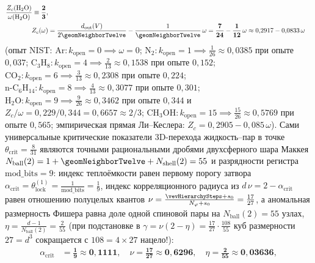 \begin{theorem}[Классификация четырёх элементарных механизмов химических реакций по каналам $(V,E,\triangle,\square)$ и закон $8 = 3 + 2 + 3$ ферментативного катализа]
\begin{enumerate}[leftmargin=*]
\begin{enumerate}[label=(\roman*),leftmargin=*,noitemsep]
\begin{equation}
\begin{aligned}
      \frac{Z_c(\mathrm{H_2O})}{\omega(\mathrm{H_2O})} \equiv \mathbf{\frac{2}{3}},\\
      Z_c(\omega) &= \frac{d_{\mathrm{out}}(V)}{2\geomNeighborTwelve} - \frac{1}{\geomNeighborTwelve}\,\omega
      = \mathbf{\frac{7}{24} - \frac{1}{12}\,\omega} \approx 0{,}2917 - 0{,}0833\,\omega
    \end{aligned}
    \end{equation}
    (опыт NIST: $\mathrm{Ar}\colon k_{\mathrm{open}}=0 \implies \omega=0$; $\mathrm{N_2}\colon k_{\mathrm{open}}=1 \implies \frac{1}{26}\approx 0{,}0385$ при опыте $0{,}037$; $\mathrm{C_3H_8}\colon k_{\mathrm{open}}=4 \implies \frac{2}{13}\approx 0{,}1538$ при опыте $0{,}152$; $\mathrm{CO_2}\colon k_{\mathrm{open}}=6 \implies \frac{3}{13}\approx 0{,}2308$ при опыте $0{,}224$; $\mathrm{n\text{-}C_6H_{14}}\colon k_{\mathrm{open}}=8 \implies \frac{4}{13}\approx 0{,}3077$ при опыте $0{,}301$; $\mathrm{H_2O}\colon k_{\mathrm{open}}=9 \implies \frac{9}{26}\approx 0{,}3462$ при опыте $0{,}344$ и $Z_c/\omega = 0{,}229/0{,}344 = 0{,}6657 \approx 2/3$; $\mathrm{CH_3OH}\colon k_{\mathrm{open}}=15 \implies \frac{15}{26}\approx 0{,}5769$ при опыте $0{,}565$; эмпирическая прямая Ли--Кеслера: $Z_c = 0{,}2905 - 0{,}085\,\omega$).
    Сами универсальные критические показатели 3D-перехода жидкость--пар в точке $\theta_{\mathrm{crit}} = \frac{8}{31}$ являются точными рациональными дробями двухсферного шара Маккея $N_{\mathrm{ball}}(2) = 1 + \geomNeighborTwelve + N_{\mathrm{shell}}(2) = 55$ и разрядности регистра $\mathrm{mod\_bits} = 9$: индекс теплоёмкости равен первому порогу затвора $\alpha_{\mathrm{crit}} = \theta_{\mathrm{lock}}^{(1)} = \frac{1}{\mathrm{mod\_bits}} = \frac{1}{9}$, индекс корреляционного радиуса из $d\,\nu = 2 - \alpha_{\mathrm{crit}}$ равен отношению полуцелых квантов $\nu = \frac{\vevHierarchySteps + s_0}{N_\varphi + s_0} = \frac{17}{27}$, а аномальная размерность Фишера равна доле одной спиновой пары на $N_{\mathrm{ball}}(2) = 55$ узлах, $\eta = \frac{d-1}{N_{\mathrm{ball}}(2)} = \frac{2}{55}$ (при подстановке в $\gamma = \nu(2-\eta) = \frac{17}{27}\cdot\frac{108}{55}$ куб размерности $27 = d^3$ сокращается с $108 = 4\times 27$ нацело!):
    \begin{equation}
    \label{eq:bio-3d-critical-exponents}
    \begin{aligned}
      \alpha_{\mathrm{crit}} &= \mathbf{\frac{1}{9} \approx 0{,}1111},\quad
      \nu = \mathbf{\frac{17}{27} \approx 0{,}6296},\quad
      \eta = \mathbf{\frac{2}{55} \approx 0{,}03636},\\

\end{aligned}
\end{equation}
\end{enumerate}
\end{enumerate}
\end{theorem}
